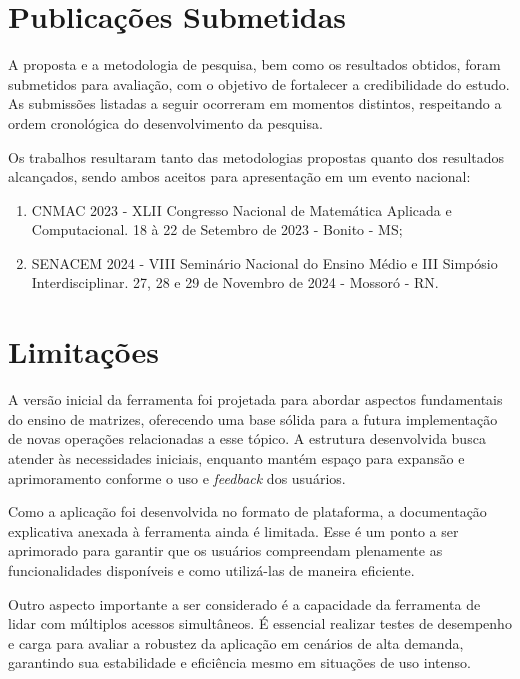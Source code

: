 \section{Publicações Submetidas}
\label{publicacoes}

A proposta e a metodologia de pesquisa, bem como os resultados obtidos, foram submetidos para avaliação, com o objetivo de fortalecer a credibilidade do estudo. As submissões listadas a seguir ocorreram em momentos distintos, respeitando a ordem cronológica do desenvolvimento da pesquisa.

Os trabalhos resultaram tanto das metodologias propostas quanto dos resultados alcançados, sendo ambos aceitos para apresentação em um evento nacional:

\begin{enumerate}
   \item CNMAC 2023 - XLII Congresso Nacional de Matemática Aplicada e Computacional. 18 à 22 de Setembro de 2023 - Bonito - MS;

   \item SENACEM 2024 - VIII Seminário Nacional do Ensino Médio e III Simpósio Interdisciplinar. 27, 28 e 29 de Novembro de 2024 - Mossoró - RN.
\end{enumerate}




\section{Limitações}
\label{limitacoes}

A versão inicial da ferramenta foi projetada para abordar aspectos fundamentais do ensino de matrizes, oferecendo uma base sólida para a futura implementação de novas operações relacionadas a esse tópico. A estrutura desenvolvida busca atender às necessidades iniciais, enquanto mantém espaço para expansão e aprimoramento conforme o uso e \textit{feedback} dos usuários.

Como a aplicação foi desenvolvida no formato de plataforma, a documentação explicativa anexada à ferramenta ainda é limitada. Esse é um ponto a ser aprimorado para garantir que os usuários compreendam plenamente as funcionalidades disponíveis e como utilizá-las de maneira eficiente.

Outro aspecto importante a ser considerado é a capacidade da ferramenta de lidar com múltiplos acessos simultâneos. É essencial realizar testes de desempenho e carga para avaliar a robustez da aplicação em cenários de alta demanda, garantindo sua estabilidade e eficiência mesmo em situações de uso intenso.

